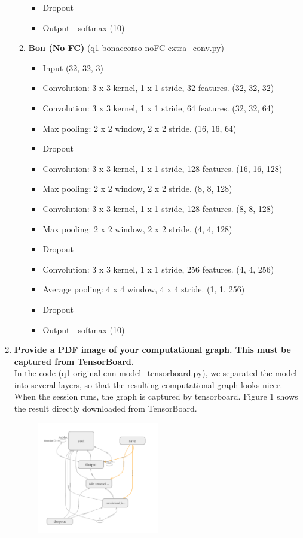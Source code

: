 \documentclass[11pt]{article}
\begin{document}
\begin{enumerate}
\begin{enumerate}
\begin{itemize}
                \item Dropout
                \item Output - softmax (10)
            \end{itemize}
        \item \textbf{Bon (No FC)} (q1-bonaccorso-noFC-extra\_conv.py)
            \begin{itemize}
                \item Input (32, 32, 3)
                \item Convolution: 3 x 3 kernel, 1 x 1 stride, 32 features. (32, 32, 32)
                \item Convolution: 3 x 3 kernel, 1 x 1 stride, 64 features. (32, 32, 64)
                \item Max pooling: 2 x 2 window, 2 x 2 stride. (16, 16, 64)
                \item Dropout
                \item Convolution: 3 x 3 kernel, 1 x 1 stride, 128 features. (16, 16, 128)
                \item Max pooling: 2 x 2 window, 2 x 2 stride. (8, 8, 128)
                \item Convolution: 3 x 3 kernel, 1 x 1 stride, 128 features. (8, 8, 128)
                \item Max pooling: 2 x 2 window, 2 x 2 stride. (4, 4, 128)
                \item Dropout
                \item Convolution: 3 x 3 kernel, 1 x 1 stride, 256 features. (4, 4, 256)
                \item Average pooling: 4 x 4 window, 4 x 4 stride. (1, 1, 256)
                \item Dropout
                \item Output - softmax (10)
            \end{itemize}
    \end{enumerate}
\item \textbf{Provide a PDF image of your computational graph. This must be captured from TensorBoard.}\\
In the code (q1-original-cnn-model\_tensorboard.py), we separated the model into several layers, so that the resulting computational graph looks nicer. When the session runs, the graph is captured by tensorboard. Figure 1 shows the result directly downloaded from TensorBoard.
\begin{figure}[h!]
    \centering
     \includegraphics[width=0.5\textwidth]{images/computational_graph}

\end{figure}
\end{enumerate}
\end{document}
